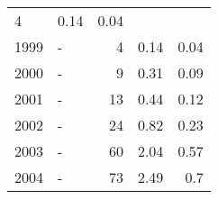 \begin{longtable}{lXrrr}
       \num{4} &
       \num[round-mode=places,round-precision=2]{0,14} &
         \num[round-mode=places,round-precision=2]{0,04} \\

     1999 &
     \multicolumn{1}{X}{ -  } &


       \num{4} &
       \num[round-mode=places,round-precision=2]{0,14} &
         \num[round-mode=places,round-precision=2]{0,04} \\

     2000 &
     \multicolumn{1}{X}{ -  } &


       \num{9} &
       \num[round-mode=places,round-precision=2]{0,31} &
         \num[round-mode=places,round-precision=2]{0,09} \\

     2001 &
     \multicolumn{1}{X}{ -  } &


       \num{13} &
       \num[round-mode=places,round-precision=2]{0,44} &
         \num[round-mode=places,round-precision=2]{0,12} \\

     2002 &
     \multicolumn{1}{X}{ -  } &


       \num{24} &
       \num[round-mode=places,round-precision=2]{0,82} &
         \num[round-mode=places,round-precision=2]{0,23} \\

     2003 &
     \multicolumn{1}{X}{ -  } &


       \num{60} &
       \num[round-mode=places,round-precision=2]{2,04} &
         \num[round-mode=places,round-precision=2]{0,57} \\

     2004 &
     \multicolumn{1}{X}{ -  } &


       \num{73} &
       \num[round-mode=places,round-precision=2]{2,49} &
         \num[round-mode=places,round-precision=2]{0,7} \\


\end{longtable}
